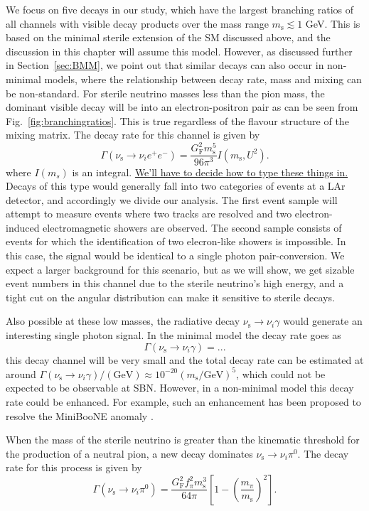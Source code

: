 \documentclass[11pt, a4paper]{article}
\newcommand{\reffig}[1]{Fig.~\ref{#1}}
\newcommand{\refsec}[1]{Section~\ref{#1}}
\newcommand{\newtext}[2]{\textcolor{#1}{\ul{#2}}}
\begin{document}
We focus on five decays in our study, which have the largest branching ratios
of all channels with visible decay products over the mass range $m_\text{s}
\lesssim 1$ GeV. This is based on the minimal sterile extension of the SM
discussed above, and the discussion in this chapter will assume this model.
However, as discussed further in \refsec{sec:BMM}, we point out that similar
decays can also occur in non-minimal models, where the relationship between
decay rate, mass and mixing can be non-standard. 
%
For sterile neutrino masses less than the pion mass, the dominant visible decay
will be into an electron-positron pair as can be seen from
\reffig{fig:branchingratios}. This is true regardless of the flavour structure
of the mixing matrix. The decay rate for this channel is given by 
%
\[ \Gamma\left(\nu_\text{s}\to \nu_i e^+e^-\right) =
\frac{G_\text{F}^2m_\text{s}^5}{96\pi^3}I(m_\text{s}, U^2).  \]
%
where $I(m_s)$ is an integral. \newtext{PB}{We'll have to decide how to type
these things in.}
%
Decays of this type would generally fall into two categories of events at a LAr
detector, and accordingly we divide our analysis. The first event sample will
attempt to measure events where two tracks are resolved and two
electron-induced electromagnetic showers are observed.
%
The second sample consists of events for which the identification of two
elecron-like showers is impossible. In this case, the signal would be identical
to a single photon pair-conversion. We expect a larger background for this
scenario, but as we will show, we get sizable event numbers in this channel due
to the sterile neutrino's high energy, and a tight cut on the angular
distribution can make it sensitive to sterile decays.

Also possible at these low masses, the radiative decay
$\nu_\text{s}\to\nu_i\gamma$ would generate an interesting single photon
signal. In the minimal model the decay rate goes as
%
\[ \Gamma(\nu_\text{s}\to\nu_i\gamma) = ...    \]
%
this decay channel will be very small and the total decay rate can be estimated
at around $\Gamma(\nu_\text{s}\to\nu_i\gamma)/(\text{GeV}) \approx 10^{-20}
(m_\text{s}/\text{GeV})^5$, which could not be expected to be observable at
SBN.  However, in a non-minimal model this decay rate could be enhanced. For
example, such an enhancement has been proposed to resolve the MiniBooNE anomaly
\cite{Gninenko:2009ks,Gninenko:2010pr}.  

When the mass of the sterile neutrino is greater than the kinematic threshold
for the production of a neutral pion, a new decay dominates
$\nu_\text{s}\to\nu_i \pi^0$. The decay rate for this process is given by
%
\[ \Gamma\left(\nu_\text{s} \to \nu_i \pi^0\right) =
\frac{G_\text{F}^2f_\pi^2m_\text{s}^3}{64\pi} \left[1-\left(
\frac{m_\pi}{m_\text{s}} \right)^2\right].  \]
\end{document}
